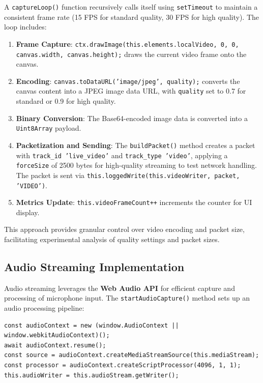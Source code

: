 A \texttt{captureLoop()} function recursively calls itself using \texttt{setTimeout} to maintain a consistent frame rate (15 FPS for standard quality, 30 FPS for high quality). The loop includes:

\begin{enumerate}
    \item \textbf{Frame Capture}: \texttt{ctx.drawImage(this.elements.localVideo, 0, 0, canvas.width\allowbreak{}, canvas.height);} draws the current video frame onto the canvas.
    \item \textbf{Encoding}: \texttt{canvas.toDataURL('image/jpeg', quality);} converts the canvas content into a JPEG image data URL, with \texttt{quality} set to 0.7 for standard or 0.9 for high quality.
    \item \textbf{Binary Conversion}: The Base64-encoded image data is converted into a \texttt{Uint8Array} payload.
    \item \textbf{Packetization and Sending}: The \texttt{buildPacket()} method creates a packet with \texttt{track\_id 'live\_video'} and \texttt{track\_type 'video'}, applying a \texttt{forceSize} of 2500 bytes for high-quality streaming to test network handling. The packet is sent via \texttt{this.loggedWrite(this.videoWriter, packet, 'VIDEO')}.
    \item \textbf{Metrics Update}: \texttt{this.videoFrameCount++} increments the counter for UI display.
\end{enumerate}

This approach provides granular control over video encoding and packet size, facilitating experimental analysis of quality settings and packet sizes.

\subsection{Audio Streaming Implementation}
Audio streaming leverages the \textbf{Web Audio API} for efficient capture and processing of microphone input. The \texttt{startAudioCapture()} method sets up an audio processing pipeline:

\begin{lstlisting}[breaklines=true,basicstyle=\small\ttfamily,frame=single]
const audioContext = new (window.AudioContext || window.webkitAudioContext)();
await audioContext.resume();
const source = audioContext.createMediaStreamSource(this.mediaStream);
const processor = audioContext.createScriptProcessor(4096, 1, 1);
this.audioWriter = this.audioStream.getWriter();
\end{lstlisting}

